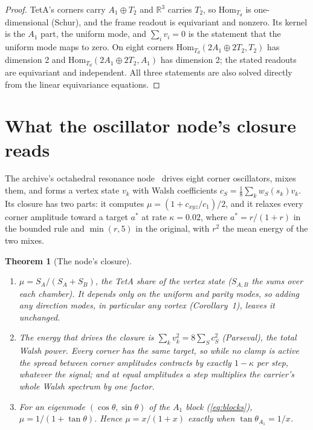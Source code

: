 \documentclass[twocolumn]{iopjournal}
\newtheorem{theorem}{Theorem}
\theoremstyle{definition}
\theoremstyle{remark}
\begin{document}
\begin{proof}
TetA's corners carry $A_1 \oplus T_2$ and $\mathbb R^3$ carries $T_2$, so
$\mathrm{Hom}_{T_d}$ is one-dimensional (Schur), and the frame readout is
equivariant and nonzero. Its kernel is the $A_1$ part, the uniform mode,
and $\sum_i v_i = 0$ is the statement that the uniform mode maps to zero.
On eight corners $\mathrm{Hom}_{T_d}(2A_1 \oplus 2T_2, T_2)$ has
dimension 2 and $\mathrm{Hom}_{T_d}(2A_1 \oplus 2T_2, A_1)$ has dimension
2; the stated readouts are equivariant and independent. All three
statements are also solved directly from the linear equivariance
equations.
\end{proof}


\section{What the oscillator node's closure reads}

The archive's octahedral resonance node~\cite{NelsonPixelated} drives
eight corner oscillators, mixes them, and forms a vertex state $v_k$ with
Walsh coefficients $c_S = \frac18\sum_k w_S(s_k)v_k$. Its closure has two
parts: it computes $\mu = (1 + c_{xyz}/c_1)/2$, and it relaxes every
corner amplitude toward a target $a^*$ at rate $\kappa = 0.02$, where $a^*
= r/(1 + r)$ in the bounded rule and $\min(r, 5)$ in the original, with
$r^2$ the mean energy of the two mixes.

\begin{theorem}[The node's closure]
\label{thm:node}
\begin{enumerate}
\item[(i)] $\mu = S_A/(S_A + S_B)$, the TetA share of the vertex state
  ($S_{A,B}$ the sums over each chamber). It depends only on the uniform
  and parity modes, so adding any direction modes, in particular any
  vortex (Corollary~1), leaves it unchanged.
\item[(ii)] The energy that drives the closure is
  $\sum_kv_k^2 = 8\sum_Sc_S^2$ (Parseval), the total Walsh power. Every
  corner has the same target, so while no clamp is active the spread
  between corner amplitudes contracts by exactly $1 - \kappa$ per step,
  whatever the signal; and at equal amplitudes a step multiplies the
  carrier's whole Walsh spectrum by one factor.
\item[(iii)] For an eigenmode $(\cos\theta, \sin\theta)$ of the $A_1$
  block (\ref{eq:blocks}), $\mu = 1/(1 + \tan\theta)$. Hence $\mu =
  x/(1+x)$ exactly when $\tan\theta_{A_1} = 1/x$.
\end{enumerate}
\end{theorem}
\end{document}
